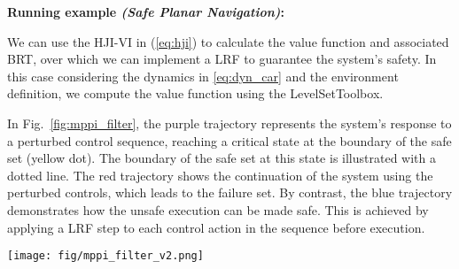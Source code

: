 \begin{mdframed}[style=MyFrame,nobreak=false]

\textbf{Running example \textit{(Safe Planar Navigation)}:}

We can use the HJI-VI in (\ref{eq:hji}) to calculate the value function and associated BRT, over which we can implement a LRF to guarantee the system's safety. In this case considering the dynamics in \eqref{eq:dyn_car} and the environment definition, we compute the value function using the LevelSetToolbox{\cite{mitchell2004toolbox}}.

In Fig.~\ref{fig:mppi_filter}, the purple trajectory represents the system's response to a perturbed control sequence, reaching a critical state at the boundary of the safe set (yellow dot). The boundary of the safe set at this state is illustrated with a dotted line. The red trajectory shows the continuation of the system using the perturbed controls, which leads to the failure set. By contrast, the blue trajectory demonstrates how the unsafe execution can be made safe. This is achieved by applying a LRF step to each control action in the sequence before execution.

\vspace{0.5em}
{\centering      \texttt{[image: fig/mppi\_filter\_v2.png]}
      \label{fig:mppi_filter} 
}

\end{mdframed}

